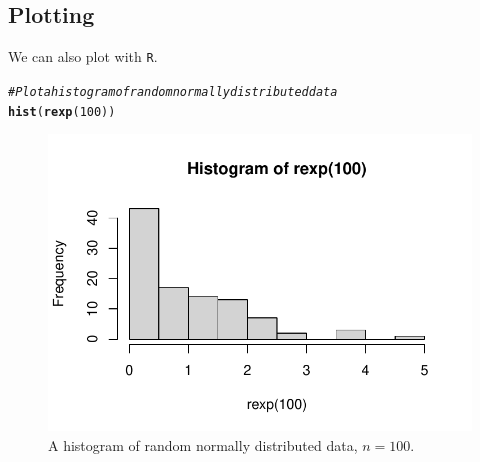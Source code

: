 \documentclass{article}\usepackage[]{graphicx}\usepackage[]{xcolor}
\makeatletter
\def\maxwidth{ %
  \ifdim\Gin@nat@width>\linewidth
    \linewidth
  \else
    \Gin@nat@width
  \fi
}
\newcommand{\hlnum}[1]{\textcolor[rgb]{0.686,0.059,0.569}{#1}}%
\newcommand{\hlcom}[1]{\textcolor[rgb]{0.678,0.584,0.686}{\textit{#1}}}%
\newcommand{\hldef}[1]{\textcolor[rgb]{0.345,0.345,0.345}{#1}}%
\newcommand{\hlkwd}[1]{\textcolor[rgb]{0.737,0.353,0.396}{\textbf{#1}}}%
\newenvironment{kframe}{%
 \def\at@end@of@kframe{}%
 \ifinner\ifhmode%
  \def\at@end@of@kframe{\end{minipage}}%
  \begin{minipage}{\columnwidth}%
 \fi\fi%
 \def\FrameCommand##1{\hskip\@totalleftmargin \hskip-\fboxsep
 \colorbox{shadecolor}{##1}\hskip-\fboxsep
     \hskip-\linewidth \hskip-\@totalleftmargin \hskip\columnwidth}%
 \MakeFramed {\advance\hsize-\width
   \@totalleftmargin\z@ \linewidth\hsize
   \@setminipage}}%
 {\par\unskip\endMakeFramed%
 \at@end@of@kframe}
\newenvironment{knitrout}{}{} %
\makeatother
\begin{document}
\begin{multicols}{2}
\subsection{Plotting}
We can also plot with \texttt{R}.
\begin{knitrout}\scriptsize
{}\color{fgcolor}\begin{kframe}
\begin{alltt}
\hlcom{#Plot a histogram of random normally distributed data}
\hlkwd{hist}\hldef{(}\hlkwd{rexp}\hldef{(}\hlnum{100}\hldef{))}
\end{alltt}
\end{kframe}
\end{knitrout}
\begin{figure}[H]
\begin{center}
\begin{knitrout}
\color{fgcolor}
\includegraphics[width=\maxwidth]{figure/unnamed-chunk-6-1} 
\end{knitrout}
\caption{A histogram of random normally distributed data, $n=100$.}
\label{plot1} %
\end{center}
\end{figure}


\end{multicols}
\end{document}
